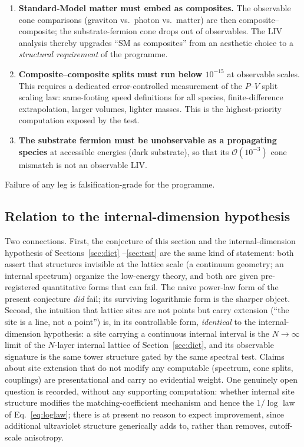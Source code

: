 \documentclass[11pt,a4paper]{article}
\begin{document}
\begin{enumerate}
\item \textbf{Standard-Model matter must embed as composites.}
The observable cone comparisons (graviton vs.\ photon vs.\
matter) are then composite--composite; the substrate-fermion cone
drops out of observables.  The LIV analysis thereby upgrades
``SM as composites'' from an aesthetic choice to a
\emph{structural requirement} of the programme.
\item \textbf{Composite--composite splits must run below
$10^{-15}$} at observable scales.  This requires a dedicated
error-controlled measurement of the $P$--$V$ split scaling law:
same-footing speed definitions for all species, finite-difference
extrapolation, larger volumes, lighter masses.  This is the
highest-priority computation exposed by the test.
\item \textbf{The substrate fermion must be unobservable as a
propagating species} at accessible energies (dark substrate),
so that its $\mathcal{O}(10^{-3})$ cone mismatch is not an
observable LIV.
\end{enumerate}
Failure of any leg is falsification-grade for the programme.

\subsection{Relation to the internal-dimension hypothesis}

Two connections.  First, the conjecture of this section and the
internal-dimension hypothesis of Sections~\ref{sec:dict}%
--\ref{sec:test} are the same kind of statement: both assert
that structures invisible at the lattice scale (a continuum
geometry; an internal spectrum) organize the low-energy theory,
and both are given pre-registered quantitative forms that can
fail.  The naive power-law form of the present conjecture
\emph{did} fail; its surviving logarithmic form is the sharper
object.  Second, the intuition that lattice sites are not points
but carry extension (``the site is a line, not a point'') is,
in its controllable form, \emph{identical} to the
internal-dimension hypothesis: a site carrying a continuous
internal interval is the $N \to \infty$ limit of the $N$-layer
internal lattice of Section~\ref{sec:dict}, and its observable
signature is the same tower structure gated by the same spectral
test.  Claims about site extension that do not modify any
computable (spectrum, cone splits, couplings) are presentational
and carry no evidential weight.  One genuinely open question is
recorded, without any supporting computation: whether internal
site structure modifies the matching-coefficient mechanism and
hence the $1/\log$ law of Eq.~\eqref{eq:loglaw}; there is at
present no reason to expect improvement, since additional
ultraviolet structure generically adds to, rather than removes,
cutoff-scale anisotropy.
\end{document}
